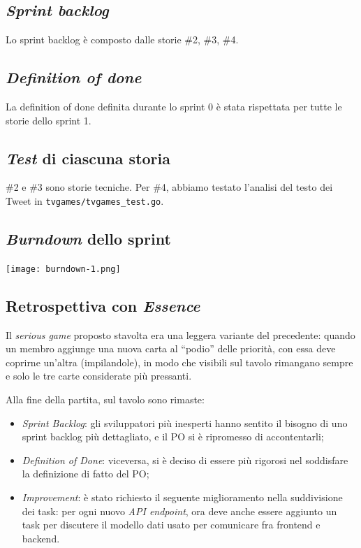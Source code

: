 \documentclass{article}
\begin{document}
\subsection{\emph{Sprint backlog}}

Lo sprint backlog è composto dalle storie \#2, \#3, \#4.

\subsection{\emph{Definition of done}}

La definition of done definita durante lo sprint 0 è stata rispettata per tutte
le storie dello sprint 1.

\subsection{\emph{Test} di ciascuna storia}

\#2 e \#3 sono storie tecniche. Per \#4, abbiamo testato l'analisi del testo dei
Tweet in \verb!tvgames/tvgames_test.go!.

\subsection{\emph{Burndown} dello sprint}

\texttt{[image: burndown-1.png]}

\subsection{Retrospettiva con \emph{Essence}}

Il \emph{serious game} proposto stavolta era una leggera variante del
precedente: quando un membro aggiunge una nuova carta al ``podio'' delle
priorità, con essa deve coprirne un'altra (impilandole), in modo che visibili
sul tavolo rimangano sempre e solo le tre carte considerate più pressanti.

Alla fine della partita, sul tavolo sono rimaste:
\begin{itemize}
	\item \emph{Sprint Backlog}: gli sviluppatori più inesperti hanno sentito il
	      bisogno di uno sprint backlog più dettagliato, e il PO si è ripromesso di
	      accontentarli;
	\item \emph{Definition of Done}: viceversa, si è deciso di essere più rigorosi
	      nel soddisfare la definizione di fatto del PO;
	\item \emph{Improvement}: è stato richiesto il seguente miglioramento nella
	      suddivisione dei task: per ogni nuovo \emph{API endpoint}, ora deve anche
	      essere aggiunto un task per discutere il modello dati usato per comunicare
	      fra frontend e backend.
\end{itemize}
\end{document}
